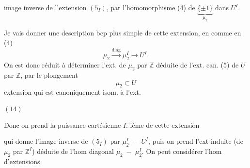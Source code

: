 image inverse de l'extension $(5_I)$, par l'homomorphisme (4) de $\underbrace{\{\pm1\}}_{\mu_2}$ dans $U^I$.

Je vais donner une description bcp plus simple de cette extension, en  comme en (4)
\[
\mu_2\xrightarrow{\mathrm{diag}}\mu_2^I\longrightarrow U^I.
\]
On est donc réduit à déterminer l'ext. de $\mu_2$ par $\mathbb Z$ déduite de l'ext. can. (5) de $U$ par $\mathbb Z$, par le plongement
\[
\mu_2\subset U
\]
extension qui est canoniquement isom. à l'ext. 

$(14)$\quad
{}

Donc on prend la puissance cartésienne $I$. ième de cette extension


qui donne l'image inverse de $(5_I)$ par $\mu_2^I\;-\;U^I$, puis on prend l'ext induite (de $\mu_2$ par $\mathbb Z^I$) déduite de l'hom diagonal $\mu_2\;-\;\mu_2^I$. On peut considérer l'hom d'extensions

